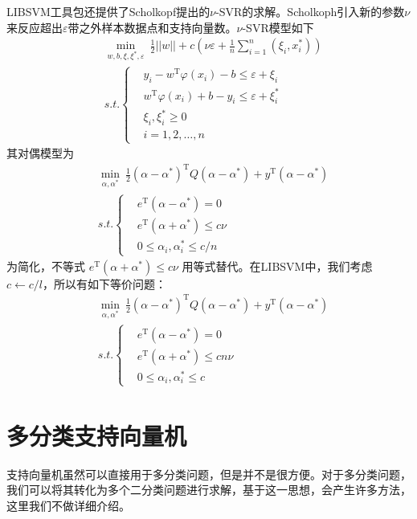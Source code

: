     \par
    LIBSVM工具包还提供了Scholkopf提出的$\nu$-SVR的求解。Scholkoph引入新的参数$\nu$来反应超出$\varepsilon$带之外样本数据点和支持向量数。$\nu$-SVR模型如下
    \begin{align*}
    & \min_{w,b,\xi,\xi^*,\varepsilon}\ \frac{1}{2}||w||+c(\nu\varepsilon+\frac{1}{n}\sum_{i=1}^n(\xi_i,x_i^*))\\
    & s.t.\left\{
    \begin{aligned}
    & y_i - w^\mathrm{T}\varphi(x_i)-b \leqslant \varepsilon +\xi_i\\
    & w^\mathrm{T}\varphi(x_i)+ b-y_i  \leqslant \varepsilon +\xi_i^*\\
    & \xi_i,\xi_i^* \geqslant 0\\
    & i=1,2,\dots,n
    \end{aligned}
    \right.
    \end{align*}
    其对偶模型为
    \begin{align*}
    & \min_{\alpha,\alpha^*}\ \frac{1}{2} (\alpha-\alpha^*)^\mathrm{T}Q(\alpha-\alpha^*) + y^\mathrm{T}(\alpha-\alpha^*)\\
    & s.t.\left\{
    \begin{aligned}
    & e^\mathrm{T}(\alpha - \alpha^*) = 0\\
    & e^\mathrm{T}(\alpha + \alpha^*) \leqslant c\nu\\
    & 0 \leqslant \alpha_i,\alpha_i^* \leqslant c/n
    \end{aligned}
    \right.
    \end{align*}
    为简化，不等式 $e^\mathrm{T}(\alpha+\alpha^*) \leqslant c\nu$ 用等式替代。在LIBSVM中，我们考虑 $c \leftarrow c/l$，所以有如下等价问题：
    \begin{align*}
    & \min_{\alpha,\alpha^*}\ \frac{1}{2} (\alpha-\alpha^*)^\mathrm{T}Q(\alpha-\alpha^*) + y^\mathrm{T}(\alpha-\alpha^*)\\
    & s.t.\left\{
    \begin{aligned}
    & e^\mathrm{T}(\alpha - \alpha^*) = 0\\
    & e^\mathrm{T}(\alpha + \alpha^*) \leqslant cn\nu\\
    & 0 \leqslant \alpha_i,\alpha_i^* \leqslant c
    \end{aligned}
    \right.
    \end{align*}

\section{多分类支持向量机}
    \par
    支持向量机虽然可以直接用于多分类问题，但是并不是很方便。对于多分类问题，我们可以将其转化为多个二分类问题进行求解，基于这一思想，会产生许多方法，这里我们不做详细介绍。

